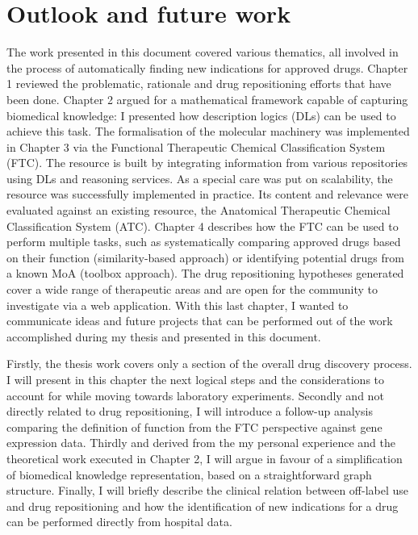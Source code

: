 \chapter{Outlook and future work}
The work presented in this document covered various thematics, all involved in the process of automatically finding new indications for approved drugs. Chapter 1 reviewed the problematic, rationale and drug repositioning efforts that have been done. Chapter 2 argued for a mathematical framework capable of capturing biomedical knowledge: I presented how description logics (DLs) can be used to achieve this task. The formalisation of the molecular machinery was implemented in Chapter 3 via the Functional Therapeutic Chemical Classification System (FTC). The resource is built by integrating information from various repositories using DLs and reasoning services. As a special care was put on scalability, the resource was successfully implemented in practice. Its content and relevance were evaluated against an existing resource, the Anatomical Therapeutic Chemical Classification System (ATC). Chapter 4 describes how the FTC can be used to perform multiple tasks, such as systematically comparing approved drugs based on their function (similarity-based approach) or identifying potential drugs from a known MoA (toolbox approach). The drug repositioning hypotheses generated cover a wide range of therapeutic areas and are open for the community to investigate via a web application. With this last chapter, I wanted to communicate ideas and future projects that can be performed out of the work accomplished during my thesis and presented in this document.

Firstly, the thesis work covers only a section of the overall drug discovery process. I will present in this chapter the next logical steps and the considerations to account for while moving towards laboratory experiments. Secondly and not directly related to drug repositioning, I will introduce a follow-up analysis comparing the definition of function from the FTC perspective against gene expression data. Thirdly and derived from the my personal experience and the theoretical work executed in Chapter 2, I will argue in favour of a simplification of biomedical knowledge representation, based on a straightforward graph structure. Finally, I will briefly describe the clinical relation between off-label use and drug repositioning and how the identification of new indications for a drug can be performed directly from hospital data.

